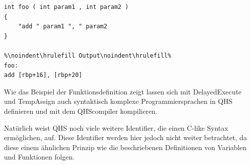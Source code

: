 \begin{lstlisting}[language=QHS, caption=Finale Definition einer Funktion in QHS]
int foo ( int param1 , int param2 )
{
    "add " param1 ", " param2
}

%\noindent\hrulefill Output\noindent\hrulefill%
foo:
add [rbp+16], [rbp+20]
\end{lstlisting}

Wie das Beispiel der Funktionsdefinition zeigt lassen sich mit DelayedExecute und TempAssign auch syntaktisch komplexe Programmiersprachen in QHS definieren und mit dem QHScompiler kompilieren.

Natürlich weist QHS noch viele weitere Identifier, die einen C-like Syntax ermöglichen, auf.
Diese Identifier werden hier jedoch nicht weiter betrachtet, da diese einem ähnlichen Prinzip wie die beschriebenen Definitionen von Variablen und Funktionen folgen.


    






